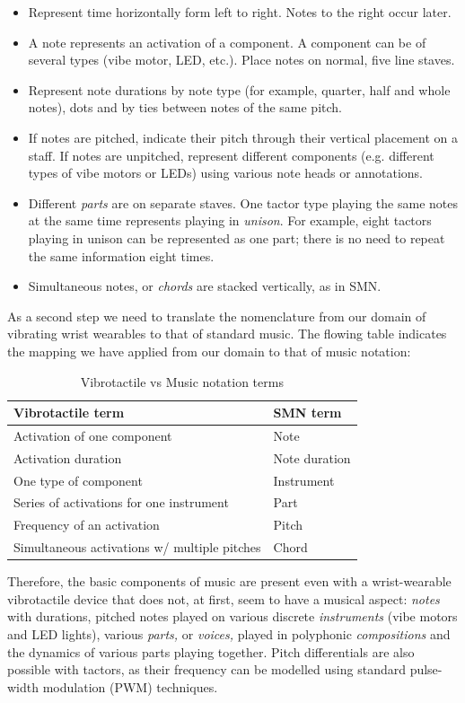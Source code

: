 \documentclass[a4paper, twocolumn]{article}
\begin{document}
\begin{itemize}
\item Represent time horizontally form left to right. Notes to the right occur later.
\item A note represents an activation of a component. A component can be of several types (vibe motor, LED, etc.). Place notes on normal, five line staves.
\item Represent note durations by note type (for example, quarter, half and whole notes), dots and by ties between notes of the same pitch.
\item If notes are pitched, indicate their pitch through their vertical placement on a staff. If notes are unpitched, represent different components (e.g. different types of vibe motors or LEDs) using various note heads or annotations.
\item Different \textit{parts} are on separate staves. One tactor type playing the same notes at the same time represents playing in \textit{unison}. For example, eight tactors playing in unison can be represented as one part; there is no need to repeat the same information eight times. 
\item Simultaneous notes, or \textit{chords} are stacked vertically, as in SMN.
\end{itemize}

As a second step we need to translate the nomenclature from our domain of vibrating wrist wearables to that of standard music. The flowing table indicates the mapping we have applied from our domain to that of music notation:

\begin{table}[htbp]
\caption{Vibrotactile vs Music notation terms}
\small
\centering
\begin{tabular}{@{}ll@{}}
\toprule
Vibrotactile term & SMN term \\ 
\midrule
Activation of one component & Note \\
Activation duration & Note duration \\
One type of component & Instrument \\
Series of activations for one instrument & Part \\
Frequency of an activation & Pitch \\
Simultaneous activations w/ multiple pitches & Chord \\ 
\bottomrule
\end{tabular}
\end{table}

Therefore, the basic components of music are present even with a wrist-wearable vibrotactile device that does not, at first, seem to have a musical aspect: \textit{notes} with durations, pitched notes played on various discrete \textit{instruments} (vibe motors and LED lights), various \textit{parts,} or \textit{voices,} played in polyphonic \textit{compositions} and the dynamics of various parts playing together. Pitch differentials are also possible with tactors, as their frequency can be modelled using standard pulse-width modulation (PWM) techniques. \cite{lindeman2006wearable}\\
\end{document}
